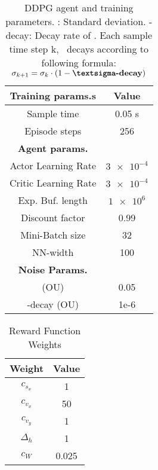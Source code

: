 {\def\arraystretch{1.4}\tabcolsep=5pt
	
	\begin{table}[h!]
			\centering
			\begin{tabular}{| c | c |} 
				\hline
				\textbf{Training params.s} & \textbf{Value} \\ [0.5ex] 
				\hline
				\hline
				Sample time & 0.05 s \\ 
				
				Episode steps & 256 \\
				
				\hline
				\textbf{Agent params.} &  \\ [0.5ex] 
				\hline
				
				Actor Learning Rate & $\num{3e-4}$ \\
				
				Critic Learning Rate & $\num{3e-4}$ \\
				
				Exp. Buf. length & $\num{1e6}$ \\
				
				Discount factor &  0.99 \\
				
				Mini-Batch size & 32 \\
				
				NN-width & 100 \\
				
				\hline
				\textbf{Noise Params.} &  \\ [0.5ex] 
				\hline
				
				\textsigma (OU) & 0.05 \\
				
				\textsigma-decay (OU) & 1e-6 \\
				
				\hline
			\end{tabular}	
			\caption[DDPG Agent Parameters]{DDPG agent and training parameters. \textsigma: Standard deviation. \textsigma-decay: Decay rate of \textsigma. Each sample time step k, \textsigma \ decays according to following formula: $\sigma_{k+1} = \sigma_k \cdot (1 - \textbf{\textsigma-\text{decay}})$}
			\label{table:DDPG parameters}
	\end{table}
}

{\def\arraystretch{1.4}\tabcolsep=5pt
	\begin{table}[h!]
		\centering
		\begin{tabular}{| c | c |}
			\hline
			\textbf{Weight} & \textbf{Value}\\
			\hline
			\hline
			$c_{s_x}$   		&  1	\\
			$c_{v_x}$   	    &  50	\\
			$c_{v_y}$  		    &  1	\\
			$\Delta_h$  		&  1	\\
			$c_W$ 				&  0.025\\
			\hline
		\end{tabular}
		\caption[Reward Weights]{Reward Function Weights}
		\label{table: Reward Weights}
	\end{table}
}

